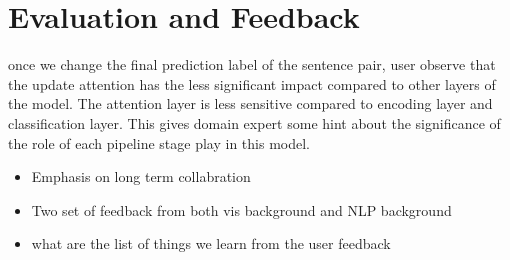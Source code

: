 \section{Evaluation and Feedback}

once we change the final prediction label of the sentence pair, user observe that the update attention has the less significant impact compared to other layers of the model. The attention layer is less sensitive compared to encoding layer and classification layer. This gives domain expert some hint about the significance of the role of each pipeline stage play in this model.

\begin{itemize}
\item Emphasis on long term collabration 
\item Two set of feedback from both vis background and NLP background
\item what are the list of things we learn from the user feedback
\end{itemize}